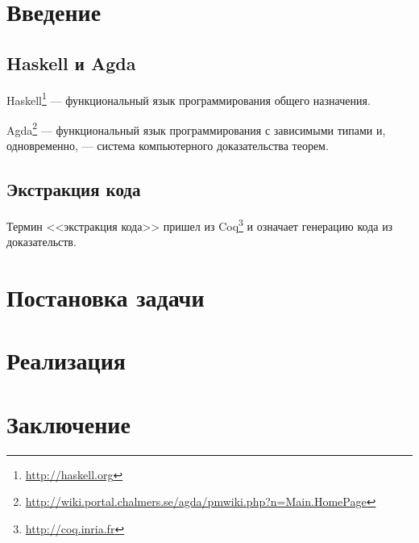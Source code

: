 \section{Введение}

\subsection{Haskell и Agda}

Haskell\footnote{\url{http://haskell.org}} --- функциональный язык программирования
общего назначения.

Agda\footnote{\url{http://wiki.portal.chalmers.se/agda/pmwiki.php?n=Main.HomePage}} ---
функциональный язык программирования с зависимыми типами и, одновременно, ---
система компьютерного доказательства теорем.

\subsection{Экстракция кода}

Термин <<экстракция кода>> пришел из Coq\footnote{\url{http://coq.inria.fr}}
и означает генерацию кода из доказательств\cite{Let02}.

\newpage
\section{Постановка задачи}

\newpage
\section{Реализация}

\newpage
\section{Заключение}
